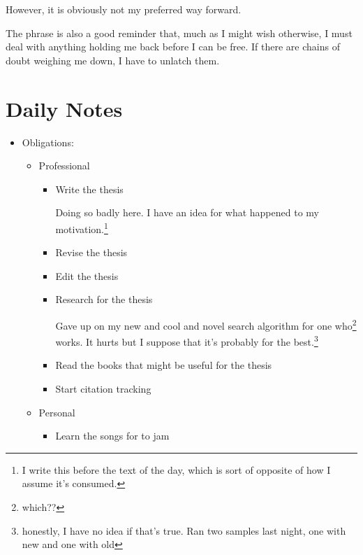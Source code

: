 \documentclass[12pt]{article}
\renewcommand{\,}{\textsuperscript{,}}
\begin{document}
However, it is obviously not my preferred way forward.

The phrase is also a good reminder that, much as I might wish otherwise, I must deal with anything holding me back before I can be free.  
If there are chains of doubt weighing me down, I have to unlatch them.

\section{Daily Notes}

\begin{itemize}

\item Obligations:

\begin{itemize}

\item Professional

\begin{itemize}

\item Write the thesis

Doing so badly here. I have an idea for what happened to my motivation.\footnote{I write this before the text of the day, which is sort of opposite of how I assume it's consumed.}

\item Revise the thesis

\item Edit the thesis

\item Research for the thesis

Gave up on my new and cool and novel search algorithm for one who\footnote{which??} works. It hurts but I suppose that it's probably for the best.\footnote{honestly, I have no idea if that's true. Ran two samples last night, one with new and one with old}

\item Read the books that might be useful for the thesis

\item Start citation tracking

\end{itemize}

\item Personal

\begin{itemize}

\item Learn the songs for to jam


\end{itemize}
\end{itemize}
\end{itemize}
\end{document}
